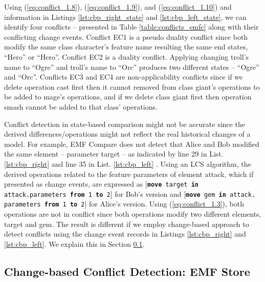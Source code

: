 Using (\ref{eq:conflict_1.8}), (\ref{eq:conflict_1.9}), and (\ref{eq:conflict_1.10}) and information in Listings \ref{lst:cbp_right_state} and \ref{lst:cbp_left_state}, we can identify four conflicts -- presented in Table \ref{table:conflicts_emfc} along with their conflicting change events. Conflict \textsf{EC1} is a pseudo duality conflict since both modify the same class \textsf{character}'s feature \textsf{name} resulting the same end states, ``Hero'' or ``Hero''. Conflict \textsf{EC2} is a duality conflict. Applying changing \textsf{troll}'s \textsf{name} to ``Ogre'' and \textsf{troll}'s \textsf{name} to ``Orc'' produces two different states -- ``Ogre'' and ``Orc''. Conflicts \textsf{EC3} and \textsf{EC4} are non-applicability conflicts since if we delete operation \textsf{cast} first then it cannot removed from class \textsf{giant}'s operations to be added to \textsf{mage}'s \textsf{operations}, and if we delete class \textsf{giant} first then operation \textsf{smash} cannot be added to that class' operations.

Conflict detection in state-based comparison might not be accurate since the derived differences/operations might not reflect the real historical changes of a model.
For example, EMF Compare does not detect that Alice and Bob modified the same element -- parameter \textsf{target} -- as indicated by line 29 in List. \ref{lst:cbp_right} and line 35 in List. \ref{lst:cbp_left} . Using an LCS algorithm, the derived operations related to the feature \textsf{parameters} of element \textsf{attack}, which if presented as change events, are expressed as [\texttt{\small \textbf{move} target \textbf{in} attack.parameters \textbf{from} 1 \textbf{to} 2}] for Bob's version and [\texttt{\small \textbf{move} gem \textbf{in} attack. parameters \textbf{from} 1 \textbf{to} 2}] for Alice's version. Using (\ref{eq:conflict_1.3}), both operations are not in conflict since both operations modify two different elements, \textsf{target} and \textsf{gem}. The result is different if we employ change-based approach to detect conflicts using the change event records in Listings \ref{lst:cbp_right} and \ref{lst:cbp_left}. We explain this in Section \ref{sec:change_based_conflict_detection_emf_store}.

\subsection{Change-based Conflict Detection: EMF Store}
\label{sec:change_based_conflict_detection_emf_store}

